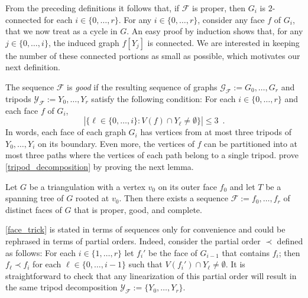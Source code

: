\documentclass{patmorin}
\begin{document}
From the preceding definitions it follows that, if $\mathcal{F}$ is proper, then  $G_i$ is $2$-connected for each $i\in\{0,\ldots,r\}$.  For any $i\in\{0,\ldots,r\}$, consider any face $f$ of $G_i$, that we now treat as a cycle in $G$.  An easy proof by induction shows that, for any $j\in\{0,\ldots,i\}$, the induced graph $f[Y_j]$ is connected. %
We are interested in keeping the number of these connected portions as small as possible, which motivates our next definition.

The sequence $\mathcal{F}$ is \emph{good} if the resulting sequence of graphs $\mathcal{G}_\mathcal{F}:=G_0,\ldots,G_r$ and tripods $\mathcal{Y}_\mathcal{F}:=Y_0,\ldots,Y_r$ satisfy the following condition:  For each $i\in\{0,\ldots, r\}$ and each face $f$ of $G_i$,
\[
   |\{\ell\in\{0,\ldots,i\}: V(f)\cap Y_{\ell}\neq\emptyset\}|\le 3 \enspace .
\]
In words, each face of each graph $G_i$ has vertices from at most three tripods of $Y_0,\ldots,Y_i$ on its boundary.  Even more, the vertices of $f$ can be partitioned into at most three paths where the vertices of each path belong to a single tripod. \citet{dujmovic.joret.ea:planar} prove \cref{tripod_decomposition} by proving the next lemma.


\begin{lem}\label{face_trick}
  Let $G$ be a triangulation with a vertex $v_0$ on its outer face $f_0$ and let $T$ be a spanning tree of $G$ rooted at $v_0$.  Then there exists a sequence $\mathcal{F}:=f_0,\ldots,f_{r}$ of distinct faces of $G$ that is proper, good, and complete.
\end{lem}

\begin{rem}
  \cref{face_trick} is stated in terms of sequences only for convenience and could be rephrased in terms of partial orders. Indeed, consider the partial order $\prec$ defined as follows:  For each $i\in\{1,\ldots,r\}$ let $f_i'$ be the face of $G_{i-1}$ that contains $f_i$; then $f_\ell\prec f_i$ for each $\ell\in\{0,\ldots,i-1\}$ such that $V(f_i')\cap Y_\ell\neq\emptyset$.  It is straightforward to check that any linearization of this partial order will result in the same tripod decomposition $\mathcal{Y_F}:=\{Y_0,\ldots,Y_{r}\}$.
\end{rem}
\end{document}
